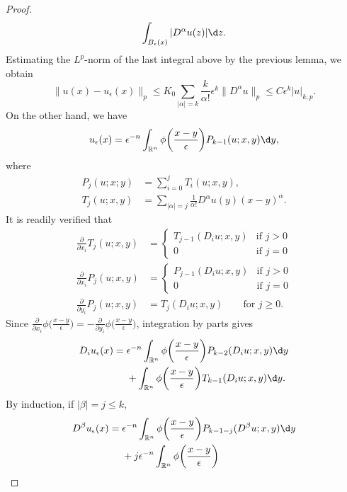 \begin{proof}
\begin{align*}
        \int_{B_{\epsilon}(x)} |D^\alpha u(z)| \d z.
  \end{align*}
  Estimating the $L^p$-norm of the last integral above by the previous lemma,
  we obtain
  \[ \|u(x)-u_{\epsilon}(x)\|_p
      \leq K_0 \sum_{|\alpha|=k} \frac{k}{\alpha!} \epsilon^k \|D^\alpha u\|_p
      \leq C \epsilon^k |u|_{k,p}. \]
  On the other hand, we have
  \[ u_{\epsilon}(x) = \epsilon^{-n} \int_{\mathbb{R}^n}
      \phi\biggl(\frac{x-y}{\epsilon}\biggr) P_{k-1}(u;x,y) \d y, \]
  where
  \begin{align*}
    P_j(u;x;y) & = \sum_{i=0}^j T_i(u;x,y), \\
    T_j(u;x,y) & = \sum_{|\alpha|=j} \frac{1}{\alpha!} D^\alpha u(y) (x-y)^\alpha.
  \end{align*}
  It is readily verified that
  \begin{align*}
    \frac{\partial}{\partial x_i} T_j(u;x,y)
    & = \begin{cases}
          T_{j-1}(D_i u;x,y) & \text{if } j>0 \\
          0 & \text{if } j=0
        \end{cases} \\
    \frac{\partial}{\partial x_i} P_j(u;x,y)
    & = \begin{cases}
          P_{j-1}(D_i u;x,y) & \text{if } j>0 \\
          0 & \text{if } j=0
        \end{cases} \\
    \frac{\partial}{\partial y_i} P_j(u;x,y)
    & = T_j(D_i u;x,y) \qquad \text{for } j\geq 0.
  \end{align*}
  Since $\frac{\partial}{\partial x_i}\phi\bigl(\frac{x-y}{\epsilon}\bigr)
  = - \frac{\partial}{\partial y_i}\phi\bigl(\frac{x-y}{\epsilon}\bigr)$,
  integration by parts gives
  \begin{align*}
    D_i u_{\epsilon}(x) ={}
    & \epsilon^{-n} \int_{\mathbb{R}^n} \phi\biggl(\frac{x-y}{\epsilon}\biggr)
      P_{k-2}(D_i u;x,y) \d y \\
    & + \int_{\mathbb{R}^n} \phi\biggl(\frac{x-y}{\epsilon}\biggr)
        T_{k-1}(D_i u;x,y) \d y.
  \end{align*}
  By induction, if $|\beta|=j\leq k$,
  \begin{align*}
    D^\beta u_\epsilon(x) ={}
    & \epsilon^{-n} \int_{\mathbb{R}^n} \phi\biggl(\frac{x-y}{\epsilon}\biggr)
      P_{k-1-j}(D^\beta u;x,y) \d y \\
    & + j \epsilon^{-n} \int_{\mathbb{R}^n} \phi\biggl(\frac{x-y}{\epsilon}\biggr)

\end{align*}
\end{proof}
